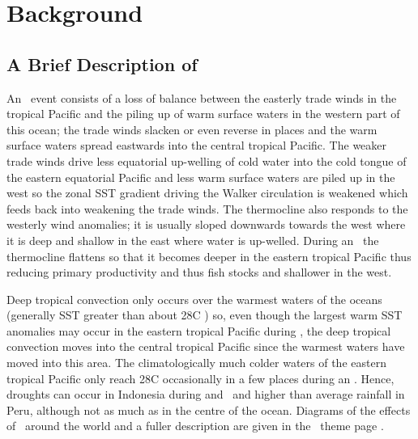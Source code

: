 

\section{Background}
\label{secn:background}

\subsection{A Brief Description of \elnino }

An \elnino\ event consists of a loss of balance between the easterly
trade winds in the tropical Pacific and the piling up of warm surface
waters in the western part of this ocean; the trade winds slacken or
even reverse in places and the warm surface waters spread eastwards
into the central tropical Pacific. The weaker trade winds drive less
equatorial up-welling of cold water into the cold tongue of the
eastern equatorial Pacific and less warm surface waters are piled up
in the west so the zonal SST gradient driving the
Walker circulation is weakened which feeds back into weakening the
trade winds. The thermocline also responds to the westerly wind
anomalies; it is usually sloped downwards towards the west where it is
deep and shallow in the east where water is up-welled. During an
\elnino\ the thermocline flattens so that it becomes deeper in the
eastern tropical Pacific thus reducing primary productivity and thus
fish stocks and shallower in the west. 

Deep tropical convection only occurs over the warmest
waters of the oceans (generally SST greater than about 28\de C
\cite{Web90}) so, even though the largest warm SST anomalies may occur
in the eastern tropical Pacific during \elnino , the deep tropical
convection moves into the central tropical Pacific since the warmest
waters have moved into this area. The climatologically much colder
waters of the eastern tropical Pacific only reach 28\de C occasionally
in a few places during an \elnino. Hence, droughts can occur in
Indonesia during and \elnino\ and higher than average rainfall in
Peru, although not as much as in the centre of the ocean. Diagrams of
the effects of \elnino\ around the world and a fuller description are
given in the \elnino\ theme page \cite{Nat00}. 

